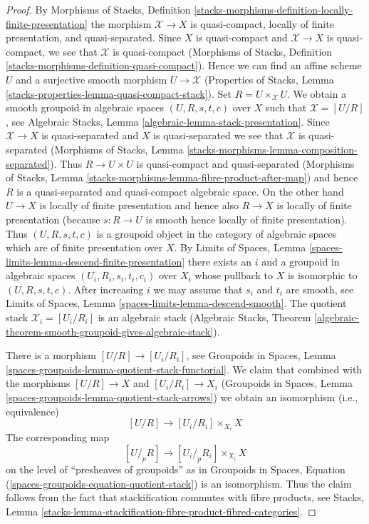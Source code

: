 \begin{proof}
By Morphisms of Stacks, Definition
\ref{stacks-morphisms-definition-locally-finite-presentation}
the morphism $\mathcal{X} \to X$ is
quasi-compact, locally of finite presentation, and quasi-separated.
Since $X$ is quasi-compact and $\mathcal{X} \to X$ is quasi-compact,
we see that $\mathcal{X}$ is quasi-compact
(Morphisms of Stacks, Definition
\ref{stacks-morphisms-definition-quasi-compact}).
Hence we can find an affine
scheme $U$ and a surjective smooth morphism $U \to \mathcal{X}$
(Properties of Stacks, Lemma
\ref{stacks-properties-lemma-quasi-compact-stack}).
Set $R = U \times_\mathcal{X} U$. We obtain a smooth groupoid
in algebraic spaces $(U, R, s, t, c)$ over $X$ such that
$\mathcal{X} = [U/R]$, see Algebraic Stacks, Lemma
\ref{algebraic-lemma-stack-presentation}.
Since $\mathcal{X} \to X$ is quasi-separated and $X$ is quasi-separated
we see that $\mathcal{X}$ is quasi-separated (Morphisms of Stacks, Lemma
\ref{stacks-morphisms-lemma-composition-separated}).
Thus $R \to U \times U$ is quasi-compact and quasi-separated
(Morphisms of Stacks, Lemma
\ref{stacks-morphisms-lemma-fibre-product-after-map})
and hence $R$ is a quasi-separated and quasi-compact algebraic space.
On the other hand $U \to X$ is locally of finite presentation
and hence also $R \to X$ is locally of finite presentation
(because $s : R \to U$ is smooth hence locally of finite presentation).
Thus $(U, R, s, t, c)$ is a groupoid object in the category
of algebraic spaces which are of finite presentation over $X$.
By Limits of Spaces, Lemma
\ref{spaces-limits-lemma-descend-finite-presentation}
there exists an $i$ and a groupoid in algebraic spaces
$(U_i, R_i, s_i, t_i, c_i)$ over $X_i$ whose pullback
to $X$ is isomorphic to $(U, R, s, t, c)$.
After increasing $i$ we may assume that
$s_i$ and $t_i$ are smooth, see
Limits of Spaces, Lemma \ref{spaces-limits-lemma-descend-smooth}.
The quotient stack $\mathcal{X}_i = [U_i/R_i]$
is an algebraic stack (Algebraic Stacks, Theorem
\ref{algebraic-theorem-smooth-groupoid-gives-algebraic-stack}).

\medskip\noindent
There is a morphism $[U/R] \to [U_i/R_i]$, see
Groupoids in Spaces, Lemma
\ref{spaces-groupoids-lemma-quotient-stack-functorial}.
We claim that combined with the morphisms
$[U/R] \to X$ and $[U_i/R_i] \to X_i$
(Groupoids in Spaces, Lemma \ref{spaces-groupoids-lemma-quotient-stack-arrows})
we obtain an isomorphism (i.e., equivalence)
$$
[U/R] \longrightarrow [U_i/R_i] \times_{X_i} X
$$
The corresponding map
$$
[U/_{\!p}R] \longrightarrow [U_i/_{\!p}R_i] \times_{X_i} X
$$
on the level of ``presheaves of groupoids'' as in
Groupoids in Spaces, Equation (\ref{spaces-groupoids-equation-quotient-stack})
is an isomorphism. Thus the claim follows from the fact that
stackification commutes with fibre products, see Stacks, Lemma
\ref{stacks-lemma-stackification-fibre-product-fibred-categories}.
\end{proof}














